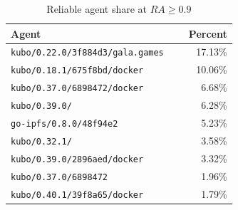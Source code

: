 \documentclass[10pt,a4paper,twocolumn]{article}
\begin{document}
\begin{table}[ht]
  \centering
  \small
  \caption{Reliable agent share at \(RA \ge 0.9\)}
  \label{tab:reliable-agent-share-rai-09}
  \begin{tabular}{p{0.72\linewidth}r}
      \hline
      Agent & Percent \\
      \hline
      \texttt{kubo/0.22.0/3f884d3/gala.games} & 17.13\% \\
      \texttt{kubo/0.18.1/675f8bd/docker} & 10.06\% \\
      \texttt{kubo/0.37.0/6898472/docker} & 6.68\% \\
      \texttt{kubo/0.39.0/} & 6.28\% \\
      \texttt{go-ipfs/0.8.0/48f94e2} & 5.23\% \\
      \texttt{kubo/0.32.1/} & 3.58\% \\
      \texttt{kubo/0.39.0/2896aed/docker} & 3.32\% \\
      \texttt{kubo/0.37.0/6898472} & 1.96\% \\
      \texttt{kubo/0.40.1/39f8a65/docker} & 1.79\% \\
      \hline
  \end{tabular}
\end{table}

\clearpage
\onecolumn

\newlength{\finalpagefigH}
\setlength{\finalpagefigH}{0.152\textheight}
\captionsetup{font=footnotesize,skip=3pt}
\captionsetup[subfigure]{font=tiny,skip=0pt}
\setlength{\abovecaptionskip}{2pt}
\setlength{\belowcaptionskip}{0pt}
\end{document}
